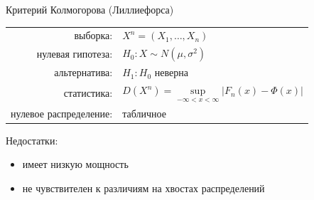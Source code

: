 \documentclass[9pt,pdf,utf8,hyperref={unicode},aspectratio=169]{beamer}
\begin{document}
\begin{frame}{Критерий Колмогорова (Лиллиефорса)}
	\begin{center}
		\begin{tabular}{rl}
			выборка:                        & $X^n=\left(X_1,\ldots,X_n\right)$         \\
			нулевая гипотеза:               & $H_0\colon X \sim N\left(\mu,\sigma^2\right)$ \\
			альтернатива:                   & $H_1\colon H_0$ неверна \\
			статистика:                     & $D\left(X^n\right) = \sup\limits_{-\infty<x<\infty} \left|F_n(x) - \Phi(x)\right|$ \\
			нулевое распределение:          & табличное\\
		\end{tabular}
	\end{center}
	
	\bigskip
	Недостатки:
	\begin{itemize}
		\item имеет низкую мощность
		\item не чувствителен к различиям на хвостах распределений
	\end{itemize}
\end{frame}
\end{document}
